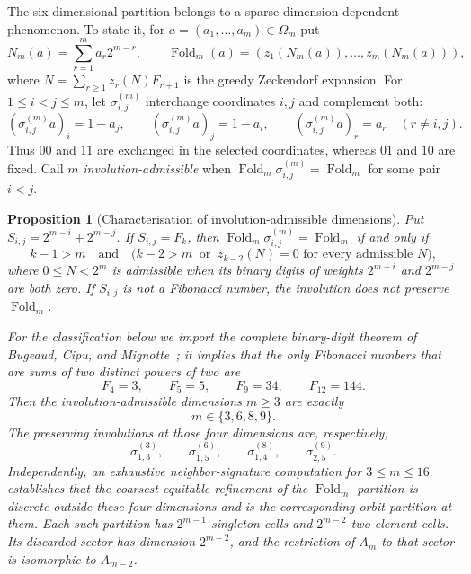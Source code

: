 \documentclass[12pt,a4paper]{article}
\theoremstyle{plain}
\newtheorem{proposition}[theorem]{Proposition}
\theoremstyle{definition}
\numberwithin{equation}{section}
\newcommand{\Fold}{\operatorname{Fold}}
\begin{document}
The six-dimensional partition belongs to a sparse dimension-dependent phenomenon.  To
state it, for \(a=(a_1,\ldots,a_m)\in\Omega_m\) put
\[
 N_m(a)=\sum_{r=1}^m a_r2^{m-r},
 \qquad
 \Fold_m(a)=(z_1(N_m(a)),\ldots,z_m(N_m(a))),
\]
where \(N=\sum_{r\ge1}z_r(N)F_{r+1}\) is the greedy Zeckendorf expansion.  For
\(1\le i<j\le m\), let \(\sigma_{i,j}^{(m)}\) interchange coordinates \(i,j\) and
complement both:
\[
 (\sigma_{i,j}^{(m)}a)_i=1-a_j,
 \qquad (\sigma_{i,j}^{(m)}a)_j=1-a_i,
 \qquad (\sigma_{i,j}^{(m)}a)_r=a_r\quad(r\ne i,j).
\]
Thus \(00\) and \(11\) are exchanged in the selected coordinates, whereas \(01\) and
\(10\) are fixed.  Call \(m\)
\emph{involution-admissible} when \(\Fold_m\sigma_{i,j}^{(m)}=\Fold_m\) for some pair
\(i<j\).

\begin{proposition}[Characterisation of involution-admissible dimensions]
\label{prop:admissible-dimensions}
Put \(S_{i,j}=2^{m-i}+2^{m-j}\).  If \(S_{i,j}=F_k\), then
\(\Fold_m\sigma_{i,j}^{(m)}=\Fold_m\) if and only if
\[
 k-1>m
 \quad\text{and}\quad
 \bigl(k-2>m\ \text{ or }\ z_{k-2}(N)=0\text{ for every admissible }N\bigr),
\]
where \(0\le N<2^m\) is admissible when its binary digits of weights \(2^{m-i}\) and
\(2^{m-j}\) are both zero.  If \(S_{i,j}\) is not a Fibonacci number, the
involution does not preserve \(\Fold_m\).

For the classification below we import the complete binary-digit theorem of
Bugeaud, Cipu, and Mignotte~\cite{bugeaud2013representation}; it implies that the
only Fibonacci numbers that are sums of two distinct powers of two are
\[
 F_4=3,\qquad F_5=5,\qquad F_9=34,\qquad F_{12}=144.
\]
Then the involution-admissible dimensions \(m\ge3\) are exactly
\[
 m\in\{3,6,8,9\}.
\]
The preserving involutions at those four dimensions are, respectively,
\[
 \sigma_{1,3}^{(3)},\qquad \sigma_{1,5}^{(6)},\qquad
 \sigma_{1,4}^{(8)},\qquad \sigma_{2,5}^{(9)}.
\]
Independently, an exhaustive neighbor-signature computation for \(3\le m\le16\)
establishes that the coarsest equitable refinement of the \(\Fold_m\)-partition is
discrete outside these four dimensions and is the corresponding orbit partition at
them.  Each such partition has \(2^{m-1}\) singleton cells and \(2^{m-2}\) two-element
cells.  Its discarded sector has dimension \(2^{m-2}\), and the restriction of \(A_m\)
to that sector is isomorphic to \(A_{m-2}\).
\end{proposition}
\end{document}
